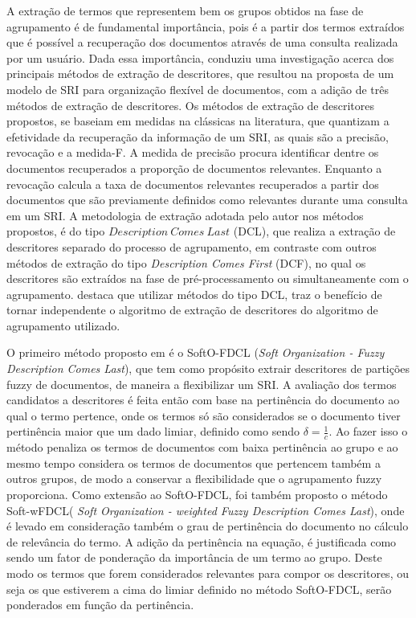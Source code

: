 A extração de termos
que representem bem os grupos obtidos na fase de agrupamento é de fundamental importância, pois é
a partir dos termos extraídos que é possível a recuperação dos documentos através de uma consulta 
realizada por um usuário. Dada essa importância, \cite{Nogueira2013} conduziu uma investigação
acerca dos principais métodos de extração de descritores, que resultou na proposta de um
modelo de SRI para organização flexível de documentos, com
a adição de três métodos de extração de descritores. Os métodos de extração de descritores 
propostos, se baseiam em medidas na clássicas na literatura, que quantizam a efetividade da 
recuperação da informação de um SRI, as quais são a precisão, revocação e a medida-F. 
A medida de precisão procura identificar dentre os documentos recuperados a proporção de documentos
relevantes. Enquanto a revocação calcula a taxa de documentos relevantes recuperados a partir dos
documentos que são previamente definidos como relevantes durante uma consulta em um SRI.
A metodologia de extração adotada pelo autor nos métodos propostos, 
é do tipo $Description\ Comes\ Last$ (DCL), que
realiza a extração de descritores separado do processo de agrupamento, em contraste com outros
métodos de extração do tipo \textit{Description Comes First\/} (DCF), no qual os descritores 
são extraídos na
fase de pré-processamento ou simultaneamente com o agrupamento. \cite{Nogueira2013} destaca que
utilizar métodos do tipo DCL, traz o benefício de tornar independente o algoritmo de extração de
descritores do algoritmo de agrupamento utilizado. 

O primeiro método proposto em \cite{Nogueira2013} é o SoftO-FDCL (\textit{Soft Organization - Fuzzy Description Comes
Last\/}), que tem como propósito extrair descritores de partições fuzzy de documentos, de maneira a
flexibilizar um SRI. A avaliação dos termos candidatos a descritores é feita então com base na
pertinência do documento ao qual o termo pertence, onde os termos só são considerados se o documento
tiver pertinência maior que um dado limiar, definido como sendo 
$\delta = \frac{1}{c}$. Ao fazer isso o método penaliza os termos de
documentos com baixa pertinência ao grupo e ao mesmo tempo considera os termos de documentos que
pertencem também a outros grupos, de modo a conservar a flexibilidade que o agrupamento fuzzy
proporciona. Como extensão ao SoftO-FDCL, foi também proposto o método Soft-wFDCL(\textit{ Soft
Organization - weighted Fuzzy Description Comes Last\/}), onde é levado em consideração também o
grau de pertinência do documento no cálculo de relevância do termo. A adição da pertinência na
equação, é justificada como sendo um fator de ponderação da importância de um termo ao grupo. Deste
modo os termos que forem considerados relevantes para compor os descritores, ou seja os que
estiverem a cima do limiar definido no método SoftO-FDCL, serão ponderados em função da pertinência.

